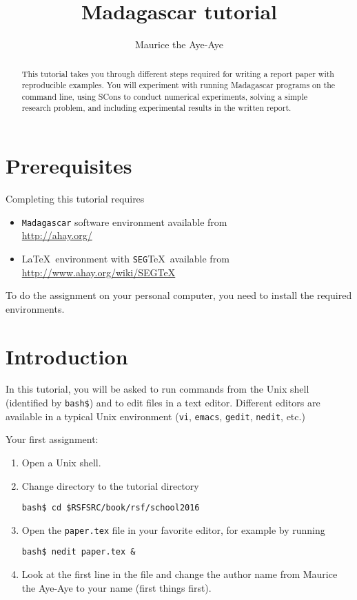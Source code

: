 \author{Maurice the Aye-Aye}
\title{Madagascar tutorial}


\begin{abstract}  
This tutorial takes you through different steps required for writing a report paper with reproducible examples. You will experiment with running Madagascar programs on the command line, using SCons to conduct numerical experiments, solving a simple research problem, and including experimental results in the written report. 
\end{abstract}

\section{Prerequisites}

Completing this tutorial requires
\begin{itemize}
\item \texttt{Madagascar} software environment available from \\
\url{http://ahay.org/}
\item \LaTeX\ environment with \texttt{SEG}\TeX\ available from \\ 
\url{http://www.ahay.org/wiki/SEGTeX}
\end{itemize}
To do the assignment on your personal computer, you need to install
the required environments. 

\section{Introduction}

In this tutorial, you will be asked to run commands from the Unix
shell (identified by \texttt{bash\$}) and to edit files in a text
editor. Different editors are available in a typical Unix environment
(\texttt{vi}, \texttt{emacs}, \texttt{gedit}, \texttt{nedit}, etc.)

Your first assignment:
\begin{enumerate}
\item Open a Unix shell.
\item Change directory to the tutorial directory
\begin{verbatim}
bash$ cd $RSFSRC/book/rsf/school2016
\end{verbatim}
\item Open the \texttt{paper.tex} file in your favorite editor, for example by
running
\begin{verbatim}
bash$ nedit paper.tex & 
\end{verbatim}
\item Look at the first line in the file and change the author name from Maurice the Aye-Aye to your name (first things first). 
\end{enumerate}

